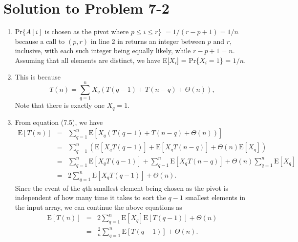 \documentclass[a4paper, fleqn]{article}
\begin{document}
\section*{Solution to Problem 7-2}
\begin{enumerate}
\renewcommand{\labelenumi}{\itshape \bfseries \alph{enumi}.}

\item  %
Pr\{$A[i]$ is chosen as the pivot where $p \leq i \leq r$\} $= 1 / (r - p + 1) = 
1 / n$ because a call to $(p,r)$ in line 2 in  
returns an integer between $p$ and $r$, inclusive, with each such integer being 
equally likely, while $r - p + 1 = n$. Assuming that all elements are distinct, 
we have E[$X_i$] = Pr\{$X_i = 1$\} = $1 / n$.




\item  %
This is because
\[
T(n) = \sum_{q=1}^n X_q(T(q - 1) + T(n - q) + \Theta(n)),
\]
Note that there is exactly one $X_q = 1$.




\item  %
From equation (7.5), we have
\begin{eqnarray*}
\mbox{E}[T(n)]
& = & \sum_{q = 1}^n \mbox{E}[X_q (T(q - 1) + T(n - q) + \Theta(n))] \\
& = & \sum_{q = 1}^n (\mbox{E}[X_q T(q - 1)] + \mbox{E}[X_q T(n - q)] + \Theta(n) \mbox{E}[X_q]) \\
& = & \sum_{q = 1}^n \mbox{E}[X_q T(q - 1)] + \sum_{q - 1}^n \mbox{E}[X_q T(n - q)] + \Theta(n) \sum_{q = 1}^n \mbox{E}[X_q] \\
& = & 2\sum_{q = 1}^n \mbox{E}[X_q T(q - 1)] + \Theta(n).
\end{eqnarray*}
Since the event of the $q$th smallest element being chosen as the pivot is 
independent of how many time it takes to sort the $q - 1$ smallest elements in 
the input array, we can continue the above equations as
\begin{eqnarray*}
\mbox{E}[T(n)]
& = & 2\sum_{q = 1}^n \mbox{E}[X_q] \mbox{E}[T(q - 1)] + \Theta(n) \\
& = & \frac{2}{n}\sum_{q = 1}^n \mbox{E}[T(q - 1)] + \Theta(n).
\end{eqnarray*}





\end{enumerate}
\end{document}
